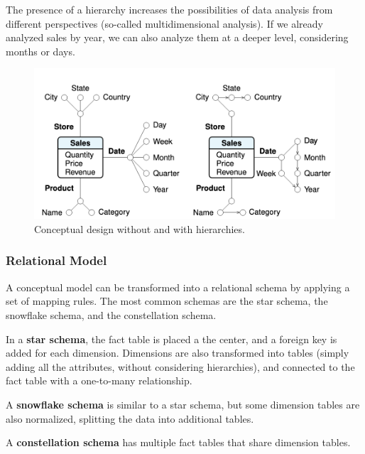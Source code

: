 The presence of a hierarchy increases the possibilities of data analysis from different perspectives (so-called multidimensional analysis). If we already analyzed sales by year, we can also analyze them at a deeper level, considering months or days.
\begin{figure}[ht]
    \centering
    \includegraphics[width=0.75\linewidth]{img/hierarchies.png}
    \caption{Conceptual design without and with hierarchies.}
    \label{fig:hierarchies}
\end{figure}

\subsubsection{Relational Model}

A conceptual model can be transformed into a relational schema by applying a set of mapping rules. The most common schemas are the star schema, the snowflake schema, and the constellation schema.

In a \textbf{star schema}, the fact table is placed a the center, and a foreign key is added for each dimension. Dimensions are also transformed into tables (simply adding all the attributes, without considering hierarchies), and connected to the fact table with a one-to-many relationship.

A \textbf{snowflake schema} is similar to a star schema, but some dimension tables are also normalized, splitting the data into additional tables.

A \textbf{constellation schema} has multiple fact tables that share dimension tables.

